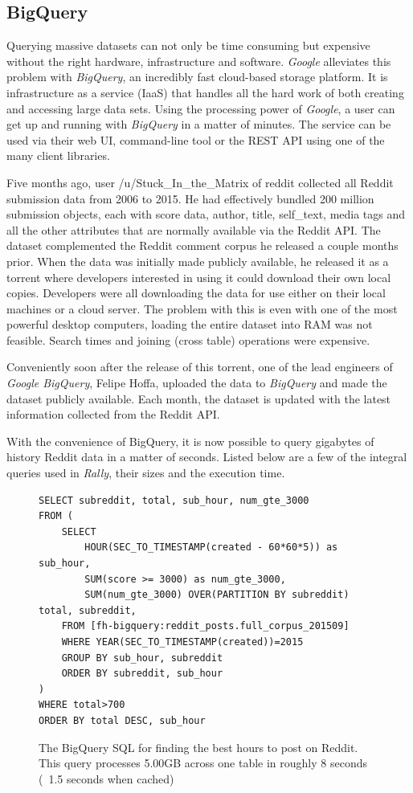 \documentclass[msc,oneside]{ubcthesis}%
\begin{document}
\subsection{BigQuery}
Querying massive datasets can not only be time consuming but expensive without the right hardware, infrastructure and software. \textit{Google} alleviates this problem with \textit{BigQuery}, an incredibly fast cloud-based storage platform. It is infrastructure as a service (IaaS) that handles all the hard work of both creating and accessing large data sets. Using the processing power of \textit{Google}, a user can get up and running with \textit{BigQuery} in a matter of minutes. The service can be used via their web UI, command-line tool or the REST API using one of the many client libraries. 
\par
Five months ago, user /u/Stuck{\_}In{\_}the{\_}Matrix of reddit collected all Reddit submission data from 2006 to 2015. He had effectively bundled 200 million submission objects, each with score data, author, title, self{\_}text, media tags and all the other attributes that are normally available via the Reddit API. The dataset complemented the Reddit comment corpus he released a couple months prior. When the data was initially made publicly available, he released it as a torrent where developers interested in using it could download their own local copies. Developers were all downloading the data for use either on their local machines or a cloud server. The problem with this is even with one of the most powerful desktop computers, loading the entire dataset into RAM was not feasible. Search times and joining (cross table) operations were expensive. 
\par
Conveniently soon after the release of this torrent, one of the lead engineers of \textit{Google BigQuery}, Felipe Hoffa, uploaded the data to \textit{BigQuery} and made the dataset publicly available. Each month, the dataset is updated with the latest information collected from the Reddit API.
\par
With the convenience of BigQuery, it is now possible to query gigabytes of history Reddit data in a matter of seconds. Listed below are a few of the integral queries used in \textit{Rally}, their sizes and the execution time.

\begin{figure}[H]
\begin{lstlisting}
SELECT subreddit, total, sub_hour, num_gte_3000
FROM (
	SELECT
		HOUR(SEC_TO_TIMESTAMP(created - 60*60*5)) as sub_hour,
		SUM(score >= 3000) as num_gte_3000,
		SUM(num_gte_3000) OVER(PARTITION BY subreddit) total, subreddit,
	FROM [fh-bigquery:reddit_posts.full_corpus_201509]
	WHERE YEAR(SEC_TO_TIMESTAMP(created))=2015
	GROUP BY sub_hour, subreddit
	ORDER BY subreddit, sub_hour
)
WHERE total>700
ORDER BY total DESC, sub_hour
\end{lstlisting}
\caption[Query finding the best hours to post on Reddit]{
The BigQuery SQL for finding the best hours to post on Reddit. This query processes 5.00GB across one table in roughly 8 seconds (~1.5 seconds when cached)}
\end{figure}
\end{document}
